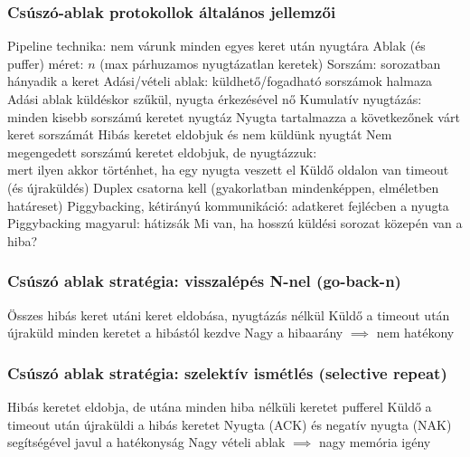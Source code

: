 \documentclass[12pt,a4paper]{article}
\begin{document}
\subsubsection{Csúszó-ablak protokollok általános jellemzői}

\begin{outline}
	\1 Pipeline technika: nem várunk minden egyes keret után nyugtára
	\1 Ablak (és puffer) méret: $n$ (max párhuzamos nyugtázatlan keretek)
	\1 Sorszám: sorozatban hányadik a keret
		\2 Adási/vételi ablak: küldhető/fogadható sorszámok halmaza
		\2 Adási ablak küldéskor szűkül, nyugta érkezésével nő
	\1 Kumulatív nyugtázás: minden kisebb sorszámú keretet nyugtáz
		\2 Nyugta tartalmazza a következőnek várt keret sorszámát
		\2 Hibás keretet eldobjuk és nem küldünk nyugtát
		\2 Nem megengedett sorszámú keretet eldobjuk, de nyugtázzuk:\\
		mert ilyen akkor történhet, ha egy nyugta veszett el
	\1 Küldő oldalon van timeout (és újraküldés)
	\1 Duplex csatorna kell (gyakorlatban mindenképpen, elméletben határeset)
		\2 Piggybacking, kétirányú kommunikáció: adatkeret fejlécben a nyugta
		\2 Piggybacking magyarul: hátizsák
	\1 Mi van, ha hosszú küldési sorozat közepén van a hiba?
\end{outline}

\pagebreak

\subsubsection{Csúszó ablak stratégia: visszalépés N-nel (go-back-n)}

\begin{outline}
	\1 Összes hibás keret utáni keret eldobása, nyugtázás nélkül
	\1 Küldő a timeout után újraküld minden keretet a hibástól kezdve
	\1 Nagy a hibaarány $\implies$ nem hatékony
\end{outline}

\subsubsection{Csúszó ablak stratégia: szelektív ismétlés (selective repeat)}

\begin{outline}
	\1 Hibás keretet eldobja, de utána minden hiba nélküli keretet pufferel
	\1 Küldő a timeout után újraküldi a hibás keretet
	\1 Nyugta (ACK) és negatív nyugta (NAK) segítségével javul a hatékonyság
	\1 Nagy vételi ablak $\implies$ nagy memória igény
\end{outline}
\end{document}
